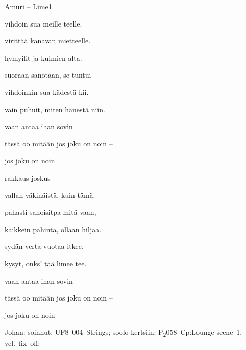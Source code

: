\documentclass[11pt,a4paper]{article}
\begin{document}
\thispagestyle{empty}
\begin{mysong}{Amuri – Lime}{1}


\begin{SBVerse}
   vihdoin  sua meille teelle.

   virittää kanavan  mietteelle.

   hymyilit ja  kulmien alta.

   suoraan sanotaan, se tuntui 

   vihdoinkin  sua kädestä kii.

   vain puhuit, miten  hänestä niin.
\end{SBVerse}

\begin{SBChorus}
   vaan antaa   ihan
  sovin

   tässä oo mitään  jos joku  on
   noin  --
  
  jos joku  on  noin 
\end{SBChorus}


\begin{SBVerse}
   rakkaus joskus 

   vallan väkinäistä,  kuin tämä.

   pahasti  sanoisitpa mitä vaan,

   kaikkein pahinta,  ollaan hiljaa.

   sydän verta vuotaa  itkee.

   kysyt, onks' tää limee  tee.
\end{SBVerse}

\begin{SBChorus}
   vaan antaa   ihan
  sovin

   tässä oo mitään  jos joku  on
   noin  --
  
  jos joku  on  noin  --
\end{SBChorus}


{\SBLyricNoteFont Johan: soinnut: UF8~004~Strings; soolo kertsiin:
P\textsubscript{2}058~Cp:Lounge scene~1, vel.~fix~off:}


\end{mysong}
\end{document}
